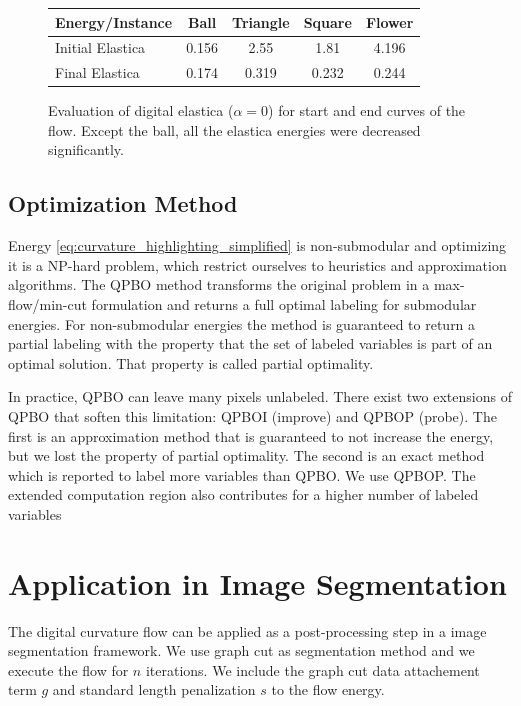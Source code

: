 \documentclass[runningheads]{llncs}
\begin{document}
\begin{figure}[!ht]
\center
\begin{tabular}{l|c|c|c|c}
	Energy/Instance & Ball & Triangle & Square & Flower\\
	\hline
	Initial Elastica & 0.156 & 2.55 & 1.81 & 4.196 \\
	Final Elastica & 0.174 & 0.319 & 0.232 & 0.244
\end{tabular}
\caption{Evaluation of digital elastica ($\alpha=0$) for start and end curves of the flow. Except the ball, all the elastica energies were decreased significantly.}
\label{tab:digital_glows_elastica_result}
\end{figure}

\subsection{Optimization Method}\label{sec:optimization_method}

	Energy \eqref{eq:curvature_highlighting_simplified} is non-submodular and optimizing it is a NP-hard problem, which restrict ourselves to heuristics and approximation algorithms. The QPBO method \cite{kolmogorov07} transforms the original problem in a max-flow/min-cut formulation and returns a full optimal labeling for submodular energies. For non-submodular energies the method is guaranteed to return a partial labeling with the property that the set of labeled variables is part of an optimal solution. That property is called partial optimality. 

	In practice, QPBO can leave many pixels unlabeled. There exist two extensions of QPBO that soften this limitation: QPBOI (improve) and QPBOP (probe). The first is an approximation method that is guaranteed to not increase the energy, but we lost the property of partial optimality. The second is an exact method which is reported to label more variables than QPBO. We use QPBOP. The extended computation region also contributes for a higher number of labeled variables
	
\section{Application in Image Segmentation}

The digital curvature flow can be applied as a post-processing step in a image segmentation framework. We use graph cut \cite{boykov01} as segmentation method and we execute the flow for $n$ iterations. We include the graph cut data attachement term $g$ and standard length penalization $s$ to the flow energy.
\end{document}
